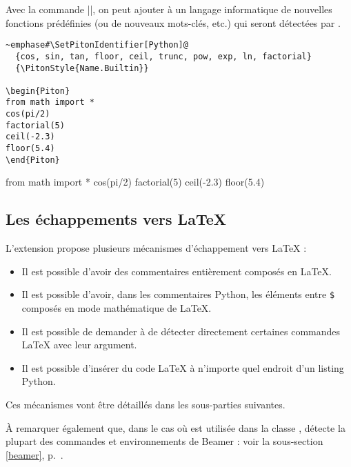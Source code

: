 \documentclass[dvipsnames,svgnames]{article}
\begin{document}
\endgroup

\bigskip
Avec la commande |\SetPitonIdentifiers|, on peut ajouter à un langage informatique de
nouvelles fonctions prédéfinies (ou de nouveaux mots-clés, etc.) qui seront détectées par
.


\begin{Verbatim}
~emphase#\SetPitonIdentifier[Python]@
  {cos, sin, tan, floor, ceil, trunc, pow, exp, ln, factorial}
  {\PitonStyle{Name.Builtin}}

\begin{Piton}
from math import *
cos(pi/2) 
factorial(5)
ceil(-2.3) 
floor(5.4) 
\end{Piton}
\end{Verbatim}

\begingroup

  {}
 
\begin{Piton}
from math import *
cos(pi/2) 
factorial(5)
ceil(-2.3) 
floor(5.4) 
\end{Piton}


\endgroup

\subsection{Les échappements vers LaTeX}


L'extension  propose plusieurs mécanismes d'échappement vers LaTeX :
\begin{itemize}
\item Il est possible d'avoir des commentaires entièrement composés en LaTeX.
\item Il est possible d'avoir, dans les commentaires Python, les éléments entre
\texttt{\$} composés en mode mathématique de LaTeX.
\item Il est possible de demander à  de détecter directement certaines
commandes LaTeX avec leur argument.
\item Il est possible d'insérer du code LaTeX à n'importe quel endroit d'un listing Python.
\end{itemize}
Ces mécanismes vont être détaillés dans les sous-parties suivantes.

\smallskip
À remarquer également que, dans le cas où  est utilisée dans la classe
,  détecte la plupart des commandes et environnements de Beamer :
voir la sous-section \ref{beamer}, p.~\pageref{beamer}.
\end{document}
